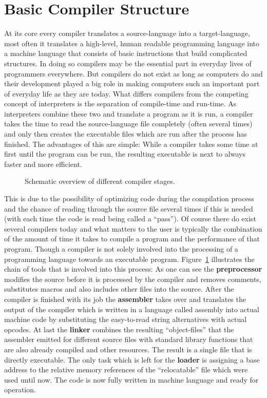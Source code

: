 \section{Basic Compiler Structure}
\label{section:compiler}
At its core every compiler translates a source-language into a target-language, most often it translates a high-level, human readable programming language into a machine language that consists of basic instructions that build complicated structures.
In doing so compilers may be the essential part in everyday lives of programmers everywhere.
But compilers do not exist as long as computers do and their development played a big role in making computers such an important part of everyday life as they are today.
What differs compilers from the competing concept of interpreters is the separation of compile-time and run-time.
As interpreters combine these two and translate a program as it is run, a compiler takes the time to read the source-language file completely (often several times) and only then creates the executable files which are run after the process has finished.
The advantages of this are simple:
While a compiler takes some time at first until the program can be run, the resulting executable is next to always faster and more efficient.

\begin{figure}
    
    \caption{\label{fig:compiler} Schematic overview of different compiler stages.}
\end{figure}


This is due to the possibility of optimizing code during the compilation process and the chance of reading through the source file several times if this is needed (with each time the code is read being called a ``pass'').
Of course there do exist several compilers today and what matters to the user is typically the combination of the amount of time it takes to compile a program and the performance of that program.
Though a compiler is not solely involved into the processing of a programming language towards an executable program.
Figure~\ref{fig:compiler} illustrates the chain of tools that is involved into this process:
As one can see the \textbf{preprocessor} modifies the source before it is processed by the compiler and removes comments, substitutes macros and also includes other files into the source.
After the compiler is finished with its job the \textbf{assembler} takes over and translates the output of the compiler which is written in a language called assembly into actual machine code by substituting the easy-to-read string alternatives with actual opcodes.
At last the \textbf{linker} combines the resulting ``object-files'' that the assembler emitted for different source files with standard library functions that are also already compiled and other resources. 
The result is a single file that is directly executable.
The only task which is left for the \textbf{loader} is assigning a base address to the relative memory references of the ``relocatable'' file which were used until now.
The code is now fully written in machine language and ready for operation.

